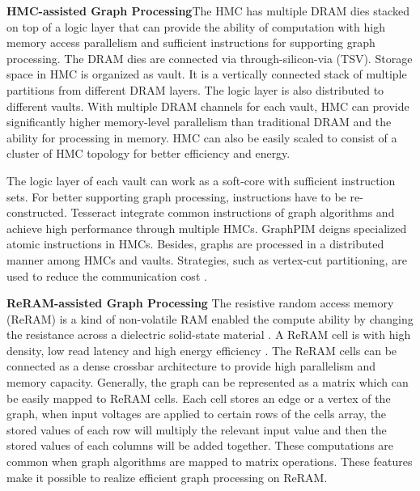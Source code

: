 \documentclass[twoside]{article}
\begin{document}
\begin{multicols}{2}
{\bf HMC-assisted Graph Processing}\quad The HMC has multiple DRAM dies stacked on top of a logic layer that can provide the ability of computation with high memory access parallelism and sufficient instructions for supporting graph processing. The DRAM dies are connected via through-silicon-via (TSV). Storage space in HMC is organized as vault. It is a vertically connected stack of multiple partitions from different DRAM layers. The logic layer is also distributed to different vaults. With multiple DRAM channels for each vault, HMC can provide significantly higher memory-level parallelism than traditional DRAM and the ability for processing in memory. HMC can also be easily scaled to consist of a cluster of HMC topology for better efficiency and energy.

The logic layer of each vault can work as a soft-core with sufficient instruction sets. For better supporting graph processing, instructions have to be re-constructed. Tesseract \cite{ahn2015tesseract} integrate common instructions of graph algorithms and achieve high performance through multiple HMCs. GraphPIM \cite{nai2017graphpim} deigns specialized atomic instructions in HMCs. Besides, graphs are processed in a distributed manner among HMCs and vaults. Strategies, such as vertex-cut partitioning, are used to reduce the communication cost \cite{zhang2018graphp, dai2018graphh}.

{\bf ReRAM-assisted Graph Processing} The resistive random access memory (ReRAM) is a kind of non-volatile RAM enabled the compute ability by changing the resistance across a dielectric solid-state material \cite{reram}. A ReRAM cell is with high density, low read latency and high energy efficiency \cite{reram2}. The ReRAM cells can be connected as a dense crossbar architecture to provide high parallelism and memory capacity. Generally, the graph can be represented as a matrix which can be easily mapped to ReRAM cells. Each cell stores an edge or a vertex of the graph, when input voltages are applied to certain rows of the cells array, the stored values of each row will multiply the relevant input value and then the stored values of each columns will be added together. These computations are common when graph algorithms are mapped to matrix operations. These features make it possible to realize efficient graph processing on ReRAM.


\end{multicols}
\end{document}
